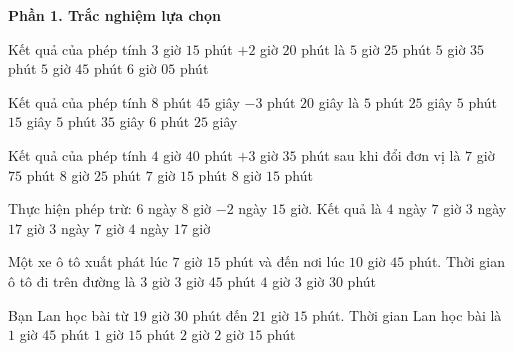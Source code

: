 \textbf{Phần 1. Trắc nghiệm lựa chọn}

\begin{ex} %
Kết quả của phép tính $3$ giờ $15$ phút $+ 2$ giờ $20$ phút là
\choice
{$5$ giờ $25$ phút}
{\True $5$ giờ $35$ phút}
{$5$ giờ $45$ phút}
{$6$ giờ $05$ phút}
\end{ex}

\begin{ex} %
Kết quả của phép tính $8$ phút $45$ giây $- 3$ phút $20$ giây là
\choice
{\True $5$ phút $25$ giây}
{$5$ phút $15$ giây}
{$5$ phút $35$ giây}
{$6$ phút $25$ giây}
\end{ex}

\begin{ex} %
Kết quả của phép tính $4$ giờ $40$ phút $+ 3$ giờ $35$ phút sau khi đổi đơn vị là
\choice
{$7$ giờ $75$ phút}
{$8$ giờ $25$ phút}
{$7$ giờ $15$ phút}
{\True $8$ giờ $15$ phút}
\end{ex}

\begin{ex} %
Thực hiện phép trừ: $6$ ngày $8$ giờ $- 2$ ngày $15$ giờ. Kết quả là
\choice
{$4$ ngày $7$ giờ}
{\True $3$ ngày $17$ giờ}
{$3$ ngày $7$ giờ}
{$4$ ngày $17$ giờ}
\end{ex}

\begin{ex} %
Một xe ô tô xuất phát lúc $7$ giờ $15$ phút và đến nơi lúc $10$ giờ $45$ phút. Thời gian ô tô đi trên đường là
\choice
{$3$ giờ}
{$3$ giờ $45$ phút}
{$4$ giờ}
{\True $3$ giờ $30$ phút}
\end{ex}

\begin{ex} %
Bạn Lan học bài từ $19$ giờ $30$ phút đến $21$ giờ $15$ phút. Thời gian Lan học bài là
\choice
{\True $1$ giờ $45$ phút}
{$1$ giờ $15$ phút}
{$2$ giờ}
{$2$ giờ $15$ phút}
\end{ex}

